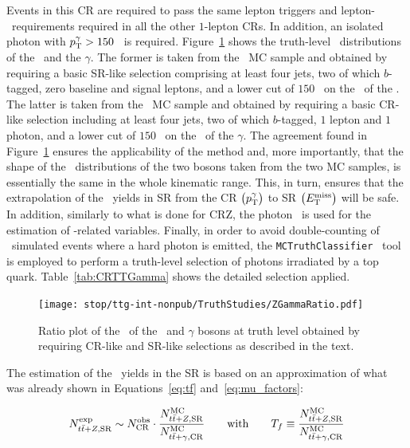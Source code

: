 		Events in this \ac{CR} are required to pass the same lepton triggers and lepton-\pt\ requirements required in all the other $1$-lepton \acp{CR}. In addition, an isolated photon with $p_{\mathrm{T}}^{\gamma} > 150$ \GeV\ is required. Figure~\ref{fig:ZGammaratio} shows the truth-level \pt\ distributions of the \Zboson\ and the $\gamma$. The former is taken from the \ttZ\ \ac{MC} sample and obtained by requiring a basic \ac{SR}-like selection comprising at least four jets, two of which $b$-tagged, zero baseline and signal leptons, and a lower cut of $150$ \GeV\ on the \pt\ of the \Zboson. The latter is taken from the \ttgamma\ \ac{MC} sample and obtained by requiring a basic \ac{CR}-like selection including at least four jets, two of which $b$-tagged, $1$ lepton and $1$ photon, and a lower cut of $150$ \GeV\ on the \pt\ of the $\gamma$. The agreement found in Figure~\ref{fig:ZGammaratio} ensures the applicability of the method and, more importantly, that the shape of the \pt\ distributions of the two bosons taken from the two \ac{MC} samples, is essentially the same in the whole kinematic range. This, in turn, ensures that the extrapolation of the \ttZ\ yields in \ac{SR} from the CR $\left(p_{\mathrm{T}}^{\gamma}\right)$ to SR $\left(E_{\mathrm{T}}^{\mathrm{miss}}\right)$ will be safe. In addition, similarly to what is done for CRZ, the photon \pt\ is used for the estimation of \met-related variables. Finally, in order to avoid double-counting of \ttbar\ simulated events where a hard photon is emitted, the \verb+MCTruthClassifier+~\cite{MCTruthClassifier} tool is employed to perform a truth-level selection of photons irradiated by a top quark. Table~\ref{tab:CRTTGamma} shows the detailed selection applied. 

		\begin{figure}[htpb]
		  \centering
		  \texttt{[image: stop/ttg-int-nonpub/TruthStudies/ZGammaRatio.pdf]}
		  \caption{Ratio plot of the \pt\ of the \Zboson\ and $\gamma$ bosons at truth level obtained by requiring \ac{CR}-like and \ac{SR}-like selections as described in the text.}
		  \label{fig:ZGammaratio}
		\end{figure}

		The estimation of the \ttZ\ yields in the \ac{SR} is based on an approximation of what was already shown in Equations~\ref{eq:tf} and~\ref{eq:mu_factors}:
		
		\begin{equation}
			N_{t\bar{t}+Z,\mathrm{SR}}^{\mathrm{exp}} \sim N_{\mathrm{CR}}^{\mathrm{obs}} \cdot \frac{N_{t\bar{t}+Z,\mathrm{SR}}^{\mathrm{MC}}}{N_{t\bar{t}+\gamma,\mathrm{CR}}^{\mathrm{MC}}} \qquad \mathrm{with} \qquad T_f \equiv \frac{N_{t\bar{t}+Z,\mathrm{SR}}^{\mathrm{MC}}}{N_{t\bar{t}+\gamma,\mathrm{CR}}^{\mathrm{MC}}}
		\label{eq:ttZ_estimation}
		\end{equation}


